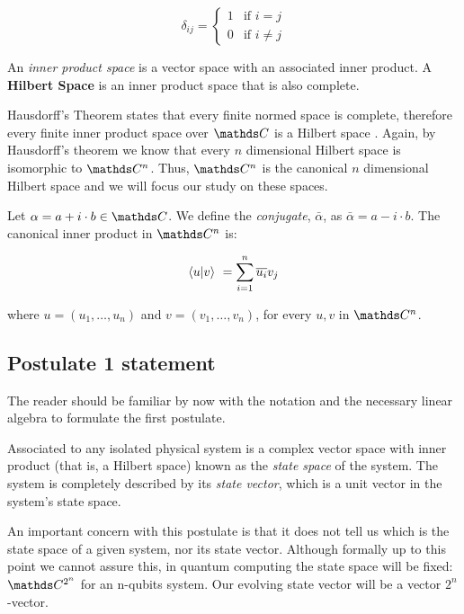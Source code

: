 \[
\delta_{ij} = 
\begin{cases}
	1 & \text{if } i = j  \\
	0 & \text{if } i \neq j
\end{cases}
\]

\begin{definition}
	An \emph{inner product space} is a vector space with an associated inner product. A \textbf{Hilbert Space} is an inner product space that is also complete.
\end{definition}

Hausdorff's Theorem states that every finite normed space is complete, therefore every finite inner product space over $\C$ is a Hilbert space \cite{Paya2020}. Again, by Hausdorff's theorem we know that every $n$ dimensional Hilbert space is isomorphic to $\C^n$. Thus, $\C^n$ is the canonical $n$ dimensional Hilbert space and we will focus our study on these spaces.

Let $\alpha = a + i \cdot b\in \C$. We define the \emph{conjugate}, $\bar \alpha$, as $\bar \alpha = a - i \cdot b$. The canonical inner product in $\C^n$ is:

$$ \langle u|v \rangle \ = \sum_{i=1}^n \overline{u_i}v_j $$

where $u = (u_1, \dotsc, u_n)$ and $v = (v_1, \dotsc, v_n)$, for every $u,v$ in $\C^n$.


\subsection{Postulate 1 statement}


The reader should be familiar by now with the notation and the necessary linear algebra to formulate the first postulate.

\begin{postulate}
	Associated to any isolated physical system is a complex vector space with inner product (that is, a Hilbert space) known as the \emph{state space} of the system. The system is completely described by its \emph{state vector}, which is a unit vector in the system’s state space.
\end{postulate}

An important concern with this postulate is that it does not tell us which is the state space of a given system, nor its state vector. Although formally up to this point we cannot assure this, in quantum computing the state space will be fixed: $\C^{2^n}$ for an n-qubits system. Our evolving state vector will be a vector $2^n$-vector.

